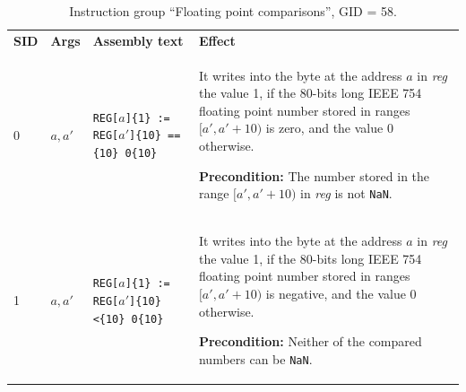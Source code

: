 \documentclass[10pt,twocolumn]{article}
\begin{document}


\begin{table}[!h]
\begin{center}
\def\arraystretch{1.5}
\begin{tabular}{lp{1.2cm}p{5.5cm}p{7.5cm}}
\textbf{SID} & \textbf{Args} & \textbf{Assembly text} & \textbf{Effect}
\\

0 & $ a,a' $ %
& \texttt{REG[}$ a $\texttt{]\{1\} := REG[}$ a' $\texttt{]\{10\} ==\{10\} 0\{10\}} %
& It writes into the byte at the address $ a $ in \textit{reg} the value 1, if
the $ 80 $-bits long IEEE 754 floating point number stored in ranges $
[a',a'+10) $ is zero, and the value 0 otherwise.

\textbf{Precondition:} The number stored in the range $ [a',a'+10) $ in
\textit{reg} is not \texttt{NaN}. \\

1 & $ a,a' $ %
& \texttt{REG[}$ a $\texttt{]\{1\} := REG[}$ a' $\texttt{]\{10\} <\{10\}
0\{10\}} %
& It writes into the byte at the address $ a $ in \textit{reg} the value 1, if
the $ 80 $-bits long IEEE 754 floating point number stored in ranges $
[a',a'+10) $ is negative, and the value 0 otherwise.

\textbf{Precondition:} Neither of the compared numbers can be \texttt{NaN}. \\

\end{tabular}
\end{center}
\caption{Instruction group ``Floating point comparisons'', GID = 58.}
\label{tab:igroup:fpcomparisons}
\end{table}


\end{document}
